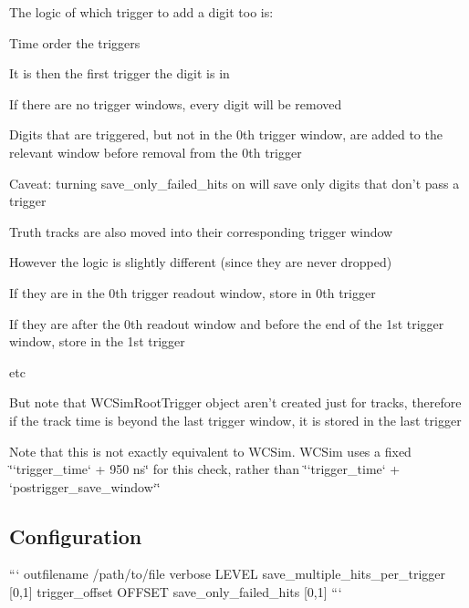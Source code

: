 \begin{DoxyItemize}
\begin{DoxyItemize}
\begin{DoxyItemize}
\end{DoxyItemize}
\item The logic of which trigger to add a digit too is\-:
\begin{DoxyItemize}
\item Time order the triggers
\item It is then the first trigger the digit is in
\end{DoxyItemize}
\item If there are no trigger windows, every digit will be removed
\item Digits that are triggered, but not in the 0th trigger window, are added to the relevant window before removal from the 0th trigger
\item Caveat\-: turning {\ttfamily save\-\_\-only\-\_\-failed\-\_\-hits} on will save only digits that don't pass a trigger
\end{DoxyItemize}
\item Truth tracks are also moved into their corresponding trigger window
\begin{DoxyItemize}
\item However the logic is slightly different (since they are never dropped)
\begin{DoxyItemize}
\item If they are in the 0th trigger readout window, store in 0th trigger
\item If they are after the 0th readout window and before the end of the 1st trigger window, store in the 1st trigger
\item etc
\item But note that W\-C\-Sim\-Root\-Trigger object aren't created just for tracks, therefore if the track time is beyond the last trigger window, it is stored in the last trigger
\end{DoxyItemize}
\item Note that this is not exactly equivalent to W\-C\-Sim. W\-C\-Sim uses a fixed \char`\"{}`trigger\-\_\-time` + 950 ns\char`\"{} for this check, rather than \char`\"{}`trigger\-\_\-time` + `postrigger\-\_\-save\-\_\-window`\char`\"{}
\end{DoxyItemize}
\end{DoxyItemize}

\subsection*{Configuration}

``` outfilename /path/to/file verbose L\-E\-V\-E\-L save\-\_\-multiple\-\_\-hits\-\_\-per\-\_\-trigger \mbox{[}0,1\mbox{]} trigger\-\_\-offset O\-F\-F\-S\-E\-T save\-\_\-only\-\_\-failed\-\_\-hits \mbox{[}0,1\mbox{]} ```


